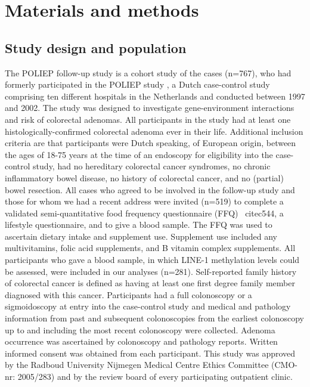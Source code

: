 \section[]{Materials and methods} %
\subsection{Study design and population} %
\noindent The POLIEP follow-up study is a cohort study of the cases (n=767), who had formerly participated in the POLIEP study \cite{c543}, a Dutch case-control study comprising ten different hospitals in the Netherlands and conducted between 1997 and 2002. The study was designed to investigate gene-environment interactions and risk of colorectal adenomas. All participants in the study had at least one histologically-confirmed colorectal adenoma ever in their life. Additional inclusion criteria are that participants were Dutch speaking, of European origin, between the ages of 18-75 years at the time of an endoscopy for eligibility into the case-control study, had no hereditary colorectal cancer syndromes, no chronic inflammatory bowel disease, no history of colorectal cancer, and no (partial) bowel resection. All cases who agreed to be involved in the follow-up study and those for whom we had a recent address were invited (n=519) to complete a validated semi-quantitative food frequency questionnaire (FFQ) \
cite{c544}, a lifestyle questionnaire, and to give a blood sample. The FFQ was used to ascertain dietary intake and supplement use. Supplement use included any multivitamins, folic acid supplements, and B vitamin complex supplements. All participants who gave a blood sample, in which LINE-1 methylation levels could be assessed, were included in our analyses (n=281). Self-reported family history of colorectal cancer is defined as having at least one first degree family member diagnosed with this cancer. Participants had a full colonoscopy or a sigmoidoscopy at entry into the case-control study and medical and pathology information from past and subsequent colonoscopies from the earliest colonoscopy up to and including the most recent colonoscopy were collected. Adenoma occurrence was ascertained by colonoscopy and pathology reports. Written informed consent was obtained from each participant. This study was approved by the Radboud University Nijmegen Medical Centre Ethics Committee (CMO-nr: 2005/283) and by 
the review board of every participating outpatient clinic.

